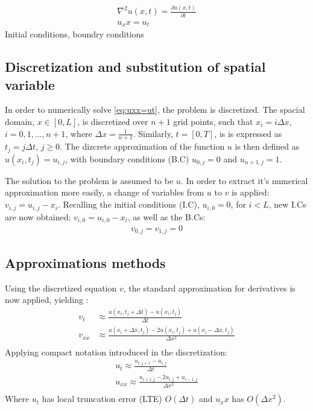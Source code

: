 \documentclass[%
oneside,                 %
final,                   %
10pt]{article}
\begin{document}
\begin{align}
\nabla^2u(x,t)=\frac{\partial u(x,t)}{\partial t} \\
u_xx=u_t \label{eq:uxx=ut}
\end{align}
Initial conditions, boundry conditions \newline


\subsection{Discretization and substitution of spatial variable}
In order to numerically solve \eqref{eq:uxx=ut}, the problem is discretized. The spacial domain, $x \in [0,L]$, is discretized over $n+1$ grid points, such that $x_i=i \Delta x$, $i=0,1,...,n+1$, where $\Delta x= \frac{1}{n+1}$. Similarly, $t=[0,T]$, is is expressed as $t_j=j \Delta t$, $j\geq 0$. The dizcrete approximation of the function $u$ is then defined as $u(x_i,t_j)=u_{i,j}$, with boundary conditions (B.C) $u_{0,j}=0$ and $u_{n+1,j}=1$. \newline

The solution to the problem is assumed to be $u$. In order to extract it's numerical approximation more easily, a change of variables from $u$ to $v$ is applied: $ v_{i,j}=u_{i,j}-x_i$. Recalling the initial conditions (I.C), $u_{i,0}=0$, for $i<L$, new I.Cs are now obtained: $v_{i,0}=u_{i,0}-x_i$, as well as the B.Cs: 
\begin{align*}
v_{0,j}=v_{1,j}=0
\end{align*}


\subsection{Approximations methods}
Using the discretized equation $v$, the standard approximation for derivatives is now applied, yielding \cite{HJ15}:
\begin{align}
v_t &\approx \frac{u(x_i,t_j+\Delta t) -u(x_i,t_j)}{\Delta t} \\
v_{xx} &\approx \frac{u(x_i+\Delta x,t_j) -2u(x_i,t_j)+u(x_i-\Delta x,t_j)}{\Delta x^2}\\
\end{align}
Applying compact notation introduced in the discretization:
\begin{align}
u_t \approx \frac{u_{i,j+1} -u_{i,j}}{\Delta t} \\
u_{xx} \approx \frac{u_{i+1,j} -2u_{i,j}+u_{i-1,j}}{\Delta x^2}\\
\end{align}
Where $u_t$ has local truncation error (LTE) $O(\Delta t)$ and  $u_xx$ has $O(\Delta x^2)$. \newline
\end{document}
